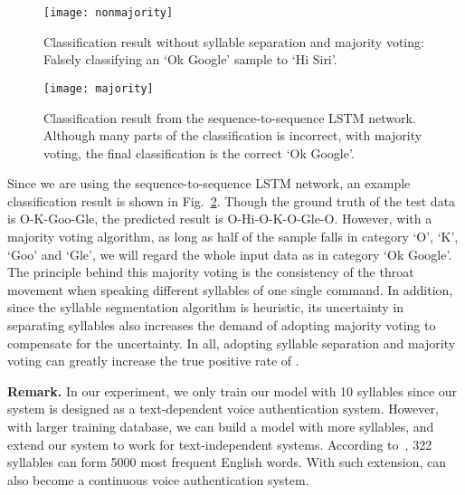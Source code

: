 \begin{figure}
	\centering
		\centering
		\texttt{[image: nonmajority]}
		\caption{Classification result without syllable separation and majority voting: Falsely classifying an `Ok Google' sample to `Hi Siri'.}
		\label{fig:nonmajority}
\end{figure}
\begin{figure}
	
		\centering
		\texttt{[image: majority]}
		\caption[Classification Result]{Classification result from the sequence-to-sequence LSTM network. Although many parts of the classification is incorrect, with majority voting, the final classification is the correct `Ok Google'. }
		\label{fig:majority}

\end{figure}


Since we are using the sequence-to-sequence LSTM network, an example classification result is shown in Fig.~\ref{fig:majority}. Though the ground truth of the test data is O-K-Goo-Gle, the predicted result is O-Hi-O-K-O-Gle-O. However, with a majority voting algorithm, as long as half of the sample falls in category `O', `K', `Goo' and `Gle', we will regard the whole input data as in category `Ok Google'. The principle behind this majority voting is the consistency of the throat movement when speaking different syllables of one single command. In addition, since the syllable segmentation algorithm is heuristic, its uncertainty in separating syllables also increases the demand of adopting majority voting to compensate for the uncertainty.
In all, adopting syllable separation and majority voting can greatly increase the true positive rate of {\shortname}.  



\textbf{Remark.} In our experiment, we only train our model with 10 syllables since our system is designed as a text-dependent voice authentication system. However, with larger training database, we can build a model with more syllables, and extend our system to work for text-independent systems. According to~\cite{onlinelist}, 322 syllables can form 5000 most frequent English words. With such extension, {\shortname} can also become a continuous voice authentication system.


